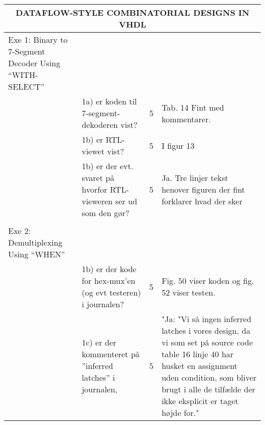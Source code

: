 \begin{table}[h]
    \small
    \begin{tabularx}{\textwidth}{p{3.5cm}Xp{5mm}X}

        \toprule
        \multicolumn{4}{c}{DATAFLOW-STYLE COMBINATORIAL DESIGNS IN VHDL}                                                                                                                                                                        \\\midrule
        Exe 1: Binary to 7-Segment Decoder Using “WITH-SELECT” &                                                                                                &   &                                                                           \\
                                                               & 1a) er koden til 7-segment-dekoderen vist?                                                     & 5 & Tab. 14 Fint med kommentarer.\\
                                                               & 1b) er RTL-viewet vist?                                                                        & 5 & I figur 13 \\
                                                               & 1b) er der evt. svaret på hvorfor RTL-vieweren ser ud som den gør?                             & 5& Ja. Tre linjer tekst henover figuren der fint forklarer hvad der sker \\
                                                               &                                                                                                &   &                                                                           \\\midrule
        Exe 2: Demultiplexing Using “WHEN”                     &                                                                                                &   &                                                                           \\
                                                               & 1b) er der kode for hex-mux’en (og evt testeren) i journalen?                                  & 5 & Fig. 50 viser koden og fig. 52 viser testen.                              \\
                                                               & 1c) er der kommenteret på ”inferred latches” i journalen,                                      & 5 & "Ja: "Vi så ingen inferred latches i vores design, da vi som set på source code table 16 linje 40 har husket en assignment uden condition, som bliver brugt i alle de tilfælde der ikke eksplicit er taget højde for." \\

\end{tabularx}
\end{table}
